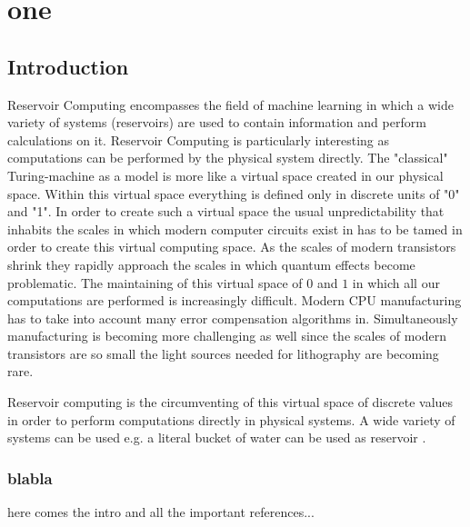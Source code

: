 \chapter{one}

\section{Introduction}

	Reservoir Computing encompasses the field of machine learning in which a wide variety of systems (reservoirs) are used to contain information and perform calculations on it. Reservoir Computing is particularly interesting as computations can be performed by the physical system directly. The "classical" Turing-machine as a model is more like a virtual space created in our physical space. Within this virtual space everything is defined only in discrete units of "0" and "1". In order to create such a virtual space the usual unpredictability that inhabits the scales in which modern computer circuits exist in has to be tamed in order to create this virtual computing space. As the scales of modern transistors shrink they rapidly approach the scales in which quantum effects become problematic. The maintaining of this virtual space of $0$ and $1$ in which all our computations are performed is increasingly difficult. Modern CPU manufacturing has to take into account many error compensation algorithms in. Simultaneously manufacturing is becoming more challenging as well since the scales of modern transistors are so small the light sources needed for lithography are becoming rare.
	
	Reservoir computing is the circumventing of this virtual space of discrete values in order to perform computations directly in physical systems. A wide variety of systems can be used e.g. a literal bucket of water can be used as reservoir \cite{FER03}.

\subsection{blabla}

here comes the intro and all the important references...

